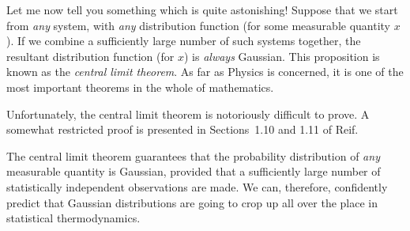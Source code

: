  Let me now tell you something which
is quite astonishing!  Suppose that we  start from {\em any}\/ system,
with {\em any}\/ distribution function (for some measurable quantity $x$). If
  we combine a sufficiently large number of
such systems together, the resultant distribution function 
(for $x$) is {\em always}\/ Gaussian.
This proposition is known as the {\em central limit theorem}. As far as 
 Physics is concerned, it is one of
the most important theorems in the whole of mathematics. 

Unfortunately, the central limit theorem is notoriously difficult to prove.
A somewhat  restricted proof is presented 
in Sections~1.10 and 1.11 of Reif.

The central limit theorem guarantees that the probability distribution of
{\em any}\/ measurable quantity
 is  Gaussian, provided that a sufficiently large number
of statistically independent observations are made. We can, therefore,
confidently predict that  Gaussian distributions are going to crop up 
all over the place in
statistical thermodynamics. 